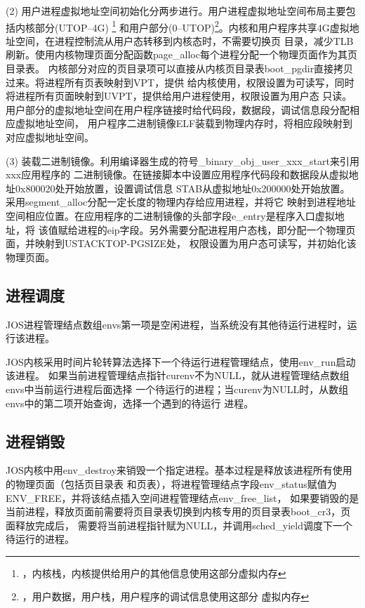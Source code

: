 \documentclass[12pt,openany,a4paper]{report}
\begin{document}
	    (2) 用户进程虚拟地址空间初始化分两步进行。用户进程虚拟地址空间布局主要包括内核部分(UTOP--4G)
	\footnote{，内核栈，内核提供给用户的其他信息使用这部分虚拟内存}
	和用户部分(0--UTOP)\footnote{，用户数据，用户栈，用户程序的调试信息使用这部分
	虚拟内存}。内核和用户程序共享4G虚拟地址空间，在进程控制流从用户态转移到内核态时，不需要切换页
	目录，减少TLB刷新。使用内核物理页面分配函数page\_alloc每个进程分配一个物理页面作为其页目录表。
	内核部分对应的页目录项可以直接从内核页目录表boot\_pgdir直接拷贝过来。将进程所有页表映射到VPT，提供
	给内核使用，权限设置为可读写，同时将进程所有页面映射到UVPT，提供给用户进程使用，权限设置为用户态
	只读。用户部分的虚拟地址空间在用户程序链接时给代码段，数据段，调试信息段分配相应虚拟地址空间，
	用户程序二进制镜像ELF装载到物理内存时，将相应段映射到对应虚拟地址空间。\par
	    (3) 装载二进制镜像。利用编译器生成的符号\_binary\_obj\_user\_xxx\_start来引用xxx应用程序的
	二进制镜像。在链接脚本中设置应用程序代码段和数据段从虚拟地址0x800020处开始放置，设置调试信息
	STAB从虚拟地址0x200000处开始放置。采用segment\_alloc分配一定长度的物理内存给应用进程，并将它
	映射到进程地址空间相应位置。在应用程序的二进制镜像的头部字段e\_entry是程序入口虚拟地址，将
	该值赋给进程的eip字段。另外需要分配进程用户态栈，即分配一个物理页面，并映射到USTACKTOP-PGSIZE处，
	权限设置为用户态可读写，并初始化该物理页面。\par
	
	\subsection{进程调度}
	    JOS进程管理结点数组envs第一项是空闲进程，当系统没有其他待运行进程时，运行该进程。\par 
	    JOS内核采用时间片轮转算法选择下一个待运行进程管理结点，使用env\_run启动该进程。
	如果当前进程管理结点指针curenv不为NULL，就从进程管理结点数组envs中当前运行进程后面选择
	一个待运行的进程；当curenv为NULL时，从数组envs中的第二项开始查询，选择一个遇到的待运行
	进程。\par
	\subsection{进程销毁}
	     JOS内核中用env\_destroy来销毁一个指定进程。基本过程是释放该进程所有使用的物理页面（包括页目录表
	和页表），将进程管理结点字段env\_status赋值为ENV\_FREE，并将该结点插入空间进程管理结点env\_free\_list，
	如果要销毁的是当前进程，释放页面前需要将页目录表切换到内核专用的页目录表boot\_cr3，页面释放完成后，
	需要将当前进程指针赋为NULL，并调用sched\_yield调度下一个待运行的进程。\par
\end{document}
